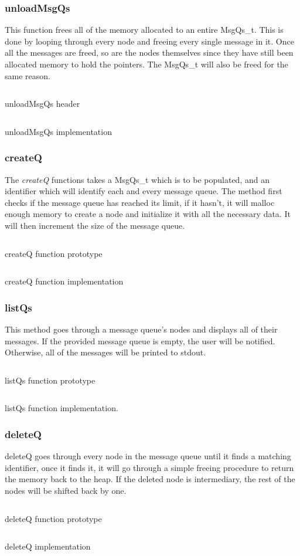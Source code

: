 \documentclass[a4paper, 12pt, titlepage]{article}
\newenvironment{code}{\captionsetup{type=listing}}{}
\newcommand{\sourcecode}[3]{
    \begin{code}
      \inputminted[linenos,numbersep=5pt,gobble=0,frame=lines,framesep=2mm,]{c}{#1}
        \caption{#2}
        \label{lst: #3}
    \end{code}
  }
\begin{document}
\begin{onehalfspacing}
  \subsubsection{unloadMsgQs}
  This function frees all of the memory allocated to an entire MsgQs\_t. This is done by looping through every node and freeing every single message in it. Once all the messages are freed, so are the nodes themselves since they have still been allocated memory to hold the pointers. The MsgQs\_t will also be freed for the same reason.

  \sourcecode{snippets/unloadMsgQs_header.c}{unloadMsgQs header}{unloadMsgQs_header}
  \sourcecode{snippets/unloadMsgQs.c}{unloadMsgQs implementation}{unloadMsgQs}

  \subsubsection{createQ}
  The \emph{createQ} functions takes a MsgQs\_t which is to be populated, and an identifier which will identify each and every message queue. The method first checks if the message queue has reached its limit, if it hasn't, it will malloc enough memory to create a node and initialize it with all the necessary data. It will then increment the size of the message queue.

  \sourcecode{snippets/createQ_header.c}{createQ function prototype}{createQ_header}
  \sourcecode{snippets/createQ.c}{createQ function implementation}{createQ}

  \subsubsection{listQs}
  This method goes through a message queue's nodes and displays all of their messages. If the provided message queue is empty, the user will be notified. Otherwise, all of the messages will be printed to stdout.

  \sourcecode{snippets/listQs_header.c}{listQs function prototype}{listQs_header}
  \sourcecode{snippets/listQs.c}{listQs function implementation.}{listQs}

  \subsubsection{deleteQ}
  deleteQ goes through every node in the message queue until it finds a matching identifier, once it finds it, it will go through a simple freeing procedure to return the memory back to the heap. If the deleted node is intermediary, the rest of the nodes will be shifted back by one.
  \sourcecode{snippets/deleteQ_header.c}{deleteQ function prototype}{deleteQ_header}
  \sourcecode{snippets/deleteQ.c}{deleteQ implementation}{deleteQ}


\end{onehalfspacing}
\end{document}
